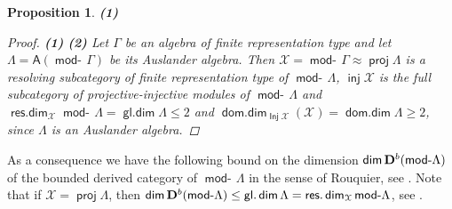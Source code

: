\documentclass[oneside, a4paper,reqno]{amsart}
\numberwithin{equation}{section}
\newtheorem{prop}[thm]{Proposition}
\theoremstyle{definition}
\begin{document}
\begin{prop} {\bf (1)}
\begin{proof} {\bf (1)}
{\bf (2)}  Let $\Gamma$ be an algebra of finite representation type
and let $\Lambda = \mathsf{A}(\operatorname*{\mathsf{mod}-\!}\Gamma)$ be its Auslander
algebra. Then ${\mathcal X} = \operatorname*{\mathsf{mod}-\!}\Gamma \approx \operatorname*{\mathsf{proj}}\Lambda$ is a resolving
subcategory of finite representation type of $\operatorname*{\mathsf{mod}-\!}\Lambda$,
$\operatorname*{\mathsf{inj}}{\mathcal X}$ is the full subcategory of projective-injective modules of
$\operatorname*{\mathsf{mod}-\!}\Lambda$ and $\operatorname*{\mathsf{res.dim}}_{\mathcal X}\operatorname*{\mathsf{mod}-\!}\Lambda = \operatorname*{\mathsf{gl.dim}}\Lambda \leq 2$ and
$\operatorname*{\mathsf{dom.dim}}_{\operatorname*{\mathsf{Inj}}{\mathcal X}}({\mathcal X}) = \operatorname*{\mathsf{dom.dim}}\Lambda \geq 2$, since $\Lambda$ is an
Auslander algebra.
\end{proof}
\end{prop}

As a consequence we have the following bound on the dimension
$\operatorname*{\mathsf{dim}}{\bf D}^{b}(\operatorname*{\mathsf{mod}-\!}\Lambda)$ of the bounded derived category of
$\operatorname*{\mathsf{mod}-\!}\Lambda$ in the sense of Rouquier, see \cite{Rouquier:Kth,
BVdB}. Note that if ${\mathcal X} = \operatorname*{\mathsf{proj}}\Lambda$, then $\operatorname*{\mathsf{dim}}{\bf
D}^{b}(\operatorname*{\mathsf{mod}-\!}\Lambda) \leq \operatorname*{\mathsf{gl.dim}}\Lambda = \operatorname*{\mathsf{res.dim}}_{\mathcal X}\operatorname*{\mathsf{mod}-\!}\Lambda$, see
\cite{Rouquier:Kth}.
\end{document}
